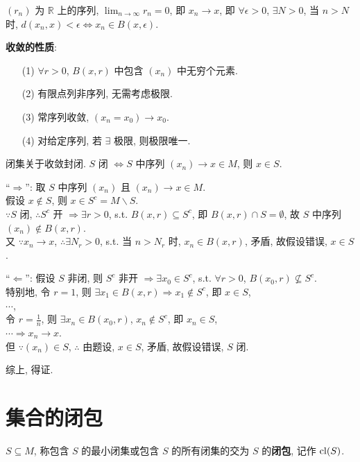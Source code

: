 \documentclass{note}
\begin{document}
\begin{eg}
    $(r_n)$ 为 $\mathbb{R}$ 上的序列, $\lim_{n\rightarrow\infty}r_n=0$, 即 $x_n\rightarrow x$, 即 $\forall\epsilon>0$, $\exists N>0$, 当 $n>N$ 时, $d(x_n,x)<\epsilon\Longleftrightarrow x_n\in B(x,\epsilon)$.
\end{eg}

\textbf{收敛的性质}:
\begin{itemize}
    \item[(1)] $\forall r>0$, $B(x,r)$ 中包含 $(x_n)$ 中无穷个元素.
    \item[(2)] 有限点列非序列, 无需考虑极限.
    \item[(3)] 常序列收敛, $(x_n=x_0)\rightarrow x_0$.
    \item[(4)] 对给定序列, 若 $\exists$ 极限, 则极限唯一.
\end{itemize}

\begin{thm}[(课本定理 12.2)]
    闭集关于收敛封闭. $S$ 闭 $\Longleftrightarrow S$ 中序列 $(x_n)\rightarrow x\in M$, 则 $x\in S$.
\end{thm}
\begin{pf}
    ``$\Longrightarrow$'': 取 $S$ 中序列 $(x_n)$ 且 $(x_n)\rightarrow x\in M$.\\
    假设 $x\notin S$, 则 $x\in S^c=M\backslash S$.\\
    $\because S$ 闭, $\therefore S^c$ 开 $\Longrightarrow\exists r>0$, s.t. $B(x,r)\subseteq S^c$, 即 $B(x,r)\cap S=\emptyset$, 故 $S$ 中序列 $(x_n)\notin B(x,r)$.\\
    又 $\because x_n\rightarrow x$, $\therefore\exists N_r>0$, s.t. 当 $n>N_r$ 时, $x_n\in B(x,r)$, 矛盾, 故假设错误, $x\in S$.

    ``$\Longleftarrow$'': 假设 $S$ 非闭, 则 $S^c$ 非开
    $\Longrightarrow\exists x_0\in S^c$, s.t. $\forall r>0$, $B(x_0,r)\nsubseteq S^c$.\\
    特别地, 令 $r=1$, 则 $\exists x_1\in B(x,r)\Longrightarrow x_1\notin S^c$, 即 $x\in S$,\\
    $\cdots$,\\
    令 $r=\frac{1}{n}$, 则 $\exists x_n\in B(x_0,r)$, $x_n\notin S^c$, 即 $x_n\in S$,\\
    $\cdots\Longrightarrow x_n\rightarrow x$.\\
    但 $\because(x_n)\in S$, $\therefore$ 由题设, $x\in S$, 矛盾, 故假设错误, $S$ 闭.

    综上, 得证.
\end{pf}

\section{集合的闭包}
\begin{df}[闭包]
    $S\subseteq M$, 称包含 $S$ 的最小闭集或包含 $S$ 的所有闭集的交为 $S$ 的\textbf{闭包}, 记作 $\operatorname{cl}(S)$.
\end{df}
\end{document}
